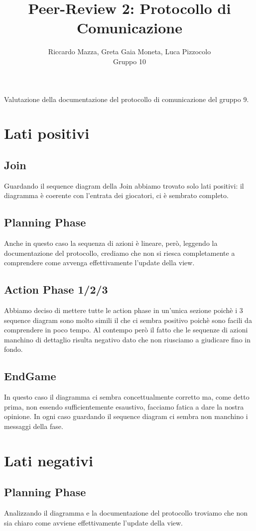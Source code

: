 \documentclass[12pt]{article}
\title{Peer-Review 2: Protocollo di Comunicazione}
\author{Riccardo Mazza, Greta Gaia Moneta, Luca Pizzocolo\\Gruppo 10}
\begin{document}
\maketitle

Valutazione della documentazione del protocollo di comunicazione del gruppo 9.

\section{Lati positivi}
\subsection{Join}
Guardando il sequence diagram della Join abbiamo trovato solo lati positivi: il diagramma è coerente con l'entrata dei giocatori, ci è sembrato completo.
\subsection{Planning Phase}
Anche in questo caso la sequenza di azioni è lineare, però, leggendo la documentazione del protocollo, crediamo che non si riesca completamente a comprendere come avvenga effettivamente l'update della view.
\subsection{Action Phase 1/2/3}
Abbiamo deciso di mettere tutte le action phase in un'unica sezione poichè i 3 sequence diagram sono molto simili il che ci sembra positivo poichè sono facili da comprendere in poco tempo. Al contempo però il fatto che le sequenze di azioni manchino di dettaglio risulta negativo dato che non riusciamo a giudicare fino in fondo. 
\subsection{EndGame}
In questo caso il diagramma ci sembra concettualmente corretto ma, come detto prima, non essendo sufficientemente esaustivo, facciamo fatica a dare la nostra opinione. In ogni caso guardando il sequence diagram ci sembra non manchino i messaggi della fase.

\section{Lati negativi}
\subsection{Planning Phase}
Analizzando il diagramma e la documentazione del protocollo troviamo che non sia chiaro come avviene effettivamente l'update della view.
\end{document}
